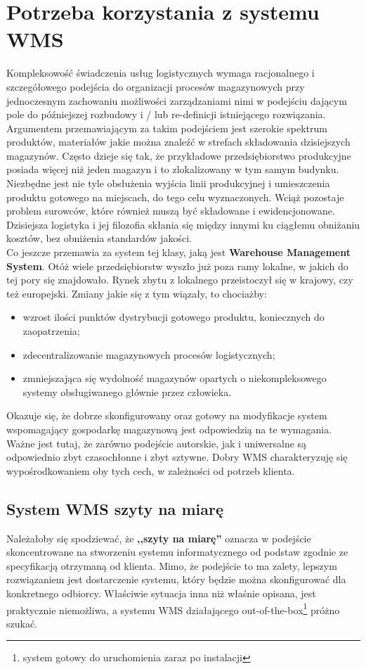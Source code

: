 \section{Potrzeba korzystania z systemu WMS}
	Kompleksowość świadczenia usług logistycznych wymaga racjonalnego i szczegółowego podejścia
	do organizacji procesów magazynowych przy jednoczesnym zachowaniu możliwości zarządzaniami
	nimi w podejściu dającym pole do późniejszej rozbudowy i / lub re-definicji istniejącego
	rozwiązania. Argumentem przemawiającym za takim podejściem jest szerokie spektrum 
	produktów, materiałów jakie można znaleźć w strefach składowania dzisiejszych magazynów.
	Często dzieje się tak, że przykładowe przedsiębiorstwo produkcyjne posiada więcej niż jeden
	magazyn i to zlokalizowany w tym samym budynku. Niezbędne jest nie tyle obsłużenia
	wyjścia linii produkcyjnej i umieszczenia produktu gotowego na miejscach, do tego celu wyznaczonych.
	Wciąż pozostaje problem surowców, które również muszą być składowane i ewidencjonowane. Dzisiejsza
	logistyka i jej filozofia skłania się między innymi ku ciągłemu obniżaniu kosztów, bez obniżenia
	standardów jakości. \\
	
	Co jeszcze przemawia za system tej klasy, jaką jest \textbf{Warehouse Management System}. Otóż 
	wiele przedsiębiorstw wyszło już poza ramy lokalne, w jakich do tej pory się znajdowało. Rynek zbytu
	z lokalnego przeistoczył się w krajowy, czy też europejski. Zmiany jakie się z tym wiązały, to chociażby:
	\begin{itemize}
		\item wzrost ilości punktów dystrybucji gotowego produktu, koniecznych do zaopatrzenia;
		\item zdecentralizowanie magazynowych procesów logistycznych;
		\item zmniejszająca się wydolność magazynów opartych o niekompleksowego systemy
		obsługiwanego głównie przez człowieka.
	\end{itemize}
	Okazuje się, że dobrze skonfigurowany oraz gotowy na modyfikacje system wspomagający gospodarkę magazynową
	jest odpowiedzią na te wymagania. Ważne jest tutaj, że zarówno podejście autorskie, jak i uniwersalne są
	odpowiednio zbyt czasochłonne i zbyt sztywne. Dobry WMS charakteryzuję się wypośrodkowaniem oby tych 
	cech, w zależności od potrzeb klienta. \\
	
	\subsection{System WMS szyty na miarę}
	Należałoby się spodziewać, że \textbf{,,szyty na miarę''} oznacza w podejście skoncentrowane
	na stworzeniu systemu informatycznego od podstaw zgodnie ze specyfikacją otrzymaną od klienta.
	Mimo, że podejście to ma zalety, lepszym rozwiązaniem jest dostarczenie systemu, który 
	będzie można skonfigurować dla konkretnego odbiorcy. Właściwie sytuacja inna niż właśnie opisana,
	jest praktycznie niemożliwa, a systemu WMS działającego out-of-the-box\footnote{system gotowy do
	uruchomienia zaraz po instalacji} próżno szukać.\\
		
